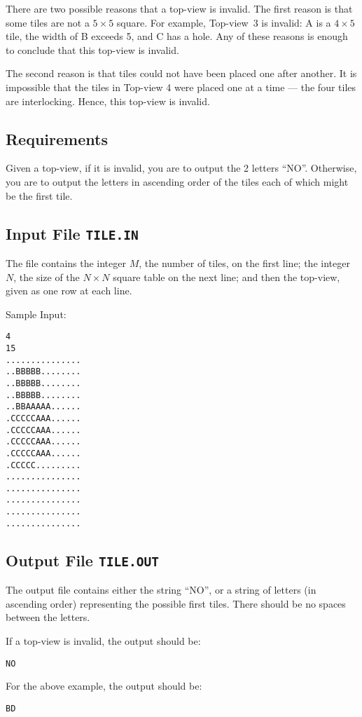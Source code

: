 There are two possible reasons that a top-view is invalid.
The first reason is that some tiles are not a $5 \times 5$ square.
For example, Top-view~3 is invalid:
A is a $4 \times 5$ tile,
the width of B exceeds 5,
and
C has a hole.
Any of these reasons is enough
to conclude that this top-view is invalid.

The second reason is that tiles could not have been placed one after another.
It is impossible that the tiles in Top-view 4 were placed one at a time ---
the four tiles are interlocking.
Hence, this top-view is invalid.

\clearpage

\subsection{Requirements}

Given a top-view, 
if it is invalid, you are to output the 2 letters ``NO''.
Otherwise, you are to output the 
letters in ascending order of the tiles each of which might be the first tile.
 
\subsection{Input File {\tt TILE.IN}}

The file contains the integer $M$, the number of tiles,
on the first line;
the integer $N$, the size of the $N\times N$ square table on the next line;
and then the top-view,
given as one row at each line.

Sample Input: 
\begin{verbatim}
4
15
...............
..BBBBB........
..BBBBB........
..BBBBB........
..BBAAAAA......
.CCCCCAAA......
.CCCCCAAA......
.CCCCCAAA......
.CCCCCAAA......
.CCCCC.........
...............
...............
...............
...............
...............
\end{verbatim}

\subsection{Output File {\tt TILE.OUT}}
 
The output file contains either the string ``NO'', or a
string of letters (in ascending order)
representing the possible first tiles.
There should be no spaces between the letters.
 
If a top-view is invalid, the output should be:
\begin{verbatim} 
NO
\end{verbatim}

For the above example, the output should be:
\begin{verbatim} 
BD
\end{verbatim}




